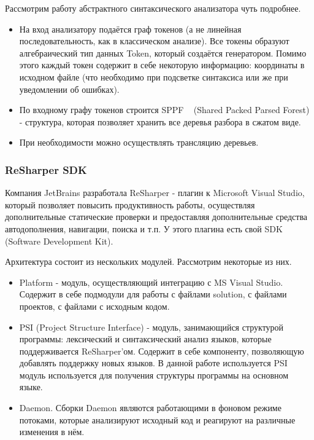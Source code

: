 Рассмотрим работу абстрактного синтаксического анализатора чуть подробнее. 
\begin{itemize}
\item
{
На вход анализатору подаётся граф токенов (а не линейная последовательность, как в классическом анализе). Все токены образуют алгебраический тип данных Token, который создаётся генератором. Помимо этого каждый токен содержит в себе некоторую информацию: координаты в исходном файле (что необходимо при подсветке синтаксиса или же при уведомлении об ошибках).
}
\item
{По входному графу токенов строится SPPF ~\cite{RNGLR} (Shared Packed Parsed Forest) - структура, которая позволяет хранить все деревья разбора в сжатом виде. 
}
\item При необходимости можно осуществлять трансляцию деревьев. 
\end{itemize}
\subsubsection{ReSharper SDK}

Компания JetBrains разработала ReSharper - плагин к Microsoft Visual Studio, который позволяет повысить продуктивность работы, осуществляя дополнительные статические проверки и предоставляя дополнительные средства автодополнения, навигации, поиска и т.п.
У этого плагина есть свой SDK (Software Development Kit).  

Архитектура состоит из нескольких модулей. Рассмотрим некоторые из них.
\begin{itemize}
\item Platform - модуль, осуществляющий интеграцию с MS Visual Studio. Содержит в себе подмодули для работы с файлами solution, с файлами проектов, с файлами с исходным кодом. 

\item PSI (Project Structure Interface) - модуль, занимающийся структурой программы: лексический и синтаксический анализ языков, которые поддерживается ReSharper’ом. Содержит в себе компоненту, позволяющую добавлять поддержку новых языков. В данной работе используется PSI модуль используется для получения структуры программы на основном языке.

\item Daemon. Сборки Daemon являются работающими в фоновом режиме потоками, которые анализируют исходный код и реагируют на различные изменения в нём. 
	
\end{itemize}

